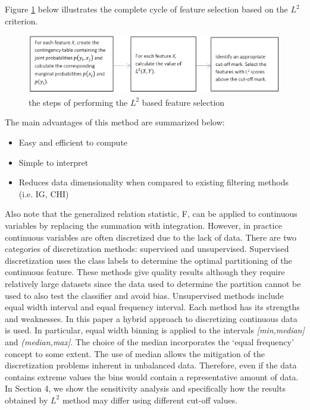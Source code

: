 \documentclass[review]{elsarticle}
\begin{document}
Figure \ref{fig:fig1} below illustrates the complete cycle of feature selection based on the $ L^2 $ criterion.\newline

\begin{figure}[h]
	\centering
	\includegraphics[width=0.9\linewidth]{figs/fig_1}
	\caption[short]{the steps of performing the $ L^2 $ based feature selection}
	\label{fig:fig1}
\end{figure}


The main advantages of this method are summarized below:
\begin{itemize}
	\item Easy and efficient to compute
	\item Simple to interpret 
	\item Reduces data dimensionality when compared to existing filtering methods (i.e. IG, CHI)
\end{itemize}


Also note that the generalized relation statistic, F, can be applied to continuous variables by replacing the summation with integration. However, in practice continuous variables are often discretized due to the lack of data. There are two categories of discretization methods: supervised and unsupervised. Supervised discretization uses the class labels to determine the optimal partitioning of the continuous feature. These methods give quality results although they require relatively large datasets since the data used to determine the partition cannot be used to also test the classifier and avoid bias. Unsupervised methods include equal width interval and equal frequency interval. Each method has its strengths and weaknesses. In this paper a hybrid approach to discretizing continuous data is used. In particular, equal width binning is applied to the intervals \textit{[min,median]} and \textit{(median,max]}. The choice of the median incorporates the ‘equal frequency’ concept to some extent. The use of median allows the mitigation of the discretization problems inherent in unbalanced data. Therefore, even if the data contains extreme values the bins would contain a representative amount of data. In Section 4, we show the sensitivity analysis and specifically how the results obtained by $ L^2 $ method may differ using different cut-off values.
\end{document}
